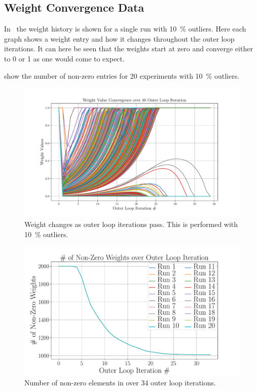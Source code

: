 \newpage
\subsection{Weight Convergence Data}\label{sec:weight-convergence-data}

In~ the weight history is shown for a single run with \SI{10}{\percent} outliers. Here each graph shows a weight entry and how it changes throughout the outer loop iterations. It can here be seen that the weights start at zero and converge either to \num{0} or \num{1} as one would come to expect.\medskip

 show the number of non-zero entries for \num{20} experiments with \SI{10}{\percent} outliers.

\begin{figure}[!h]
	\begin{center}
		\includegraphics[width=\textwidth]{chapters/2-pose-estimation/fig/GNC-TLS-w-history-conv.pdf}
	\end{center}
	\caption{Weight changes as outer loop iterations pass. This is performed with \SI{10}{\percent} outliers.}
	\label{fig:GNC-TLS-w-history-conv}
\end{figure}

\begin{figure}[!h]
	\begin{center}
		\includegraphics[width=\textwidth]{chapters/2-pose-estimation/fig/GNC-TLS-w-run-10-conv.pdf}
	\end{center}
	\caption{Number of non-zero elements in  over \num{34} outer loop iterations.}
	\label{fig:GNC-TLS-w-run-conv}
\end{figure}

